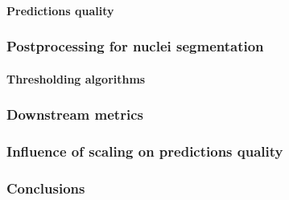         \paragraph{Predictions quality}
              
    \subsubsection{Postprocessing for nuclei segmentation}
        
        \paragraph{Thresholding algorithms}
        
    \subsubsection{Downstream metrics}
        
    \subsubsection{Influence of scaling on predictions quality} 
        
    \subsubsection{Conclusions}
        